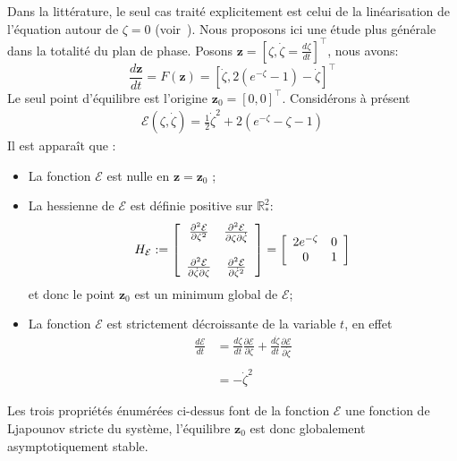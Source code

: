 Dans la littérature, le seul cas traité explicitement est celui de la linéarisation de l'équation autour de $\zeta=0$
(voir~\citet{chandra39}).
Nous proposons ici une étude plus générale dans la totalité du plan de phase. Posons $\mathbf{z}=\left[
\zeta,\dot{\zeta}=\frac{d\zeta}{dt}\right]^{\top}$, nous avons:
\begin{equation}
\frac{d\mathbf{z}}{dt} =F\left(  \mathbf{z}\right)  =
\left[\dot{\zeta},2\left(  e^{-\zeta}-1\right)-\dot{\zeta}\right]^{\top} \label{sysdif}%
\end{equation}
Le seul point d'\'{e}quilibre est l'origine $\mathbf{z}_0=\left[  0,0\right]
^{\top}$. Considérons à présent  
\begin{align*}
\mathcal{E}(\zeta,\dot{\zeta}) = \frac{1}{2}\dot{\zeta}^2+2(e^{-\zeta}-\zeta-1)
\end{align*}
Il est apparaît que :
\begin{itemize}
\item La fonction $\mathcal{E}$ est nulle en $\mathbf{z}=\mathbf{z}_0$ ;
\item La hessienne de $\mathcal{E}$ est définie positive sur $\mathbb{R}^2_*$: 
\begin{align*}
H_{\mathcal{E}}:=
\left[
\begin{array}
[c]{cc}%
\frac{\partial^2 \mathcal{E}}{\partial \zeta^2}         & \frac{\partial^2 \mathcal{E}}{\partial \zeta \partial \dot{\zeta}}\\
 & \\
\frac{\partial^2 \mathcal{E}}{\partial \dot{\zeta} \partial \zeta}& \frac{\partial^2 \mathcal{E}}{\partial \dot{\zeta}^2}
\end{array}
\right]
=\left[\begin{array}
[c]{cc}%
2e^{-\zeta}         & 0\\
0& 1
\end{array}
\right]
\end{align*}
et donc le point $\mathbf{z}_0$ est un minimum global de $\mathcal{E}$;
\item La fonction $\mathcal{E}$ est strictement décroissante de la variable $t$, en effet
\begin{align*}
\frac{d\mathcal{E}}{dt}&=\frac{d\zeta}{dt}\frac{\partial \mathcal{E}}{\partial \zeta}+\frac{d\dot{\zeta}}{dt}\frac{\partial \mathcal{E}}{\partial \dot{\zeta}} \\
\\
&=-\dot{\zeta}^2 
\end{align*}

\end{itemize}
Les trois propriétés énumérées ci-dessus font de la fonction $\mathcal{E}$ une fonction de Ljapounov stricte du système, l'équilibre $\mathbf{z}_0$ est donc globalement asymptotiquement stable. 

